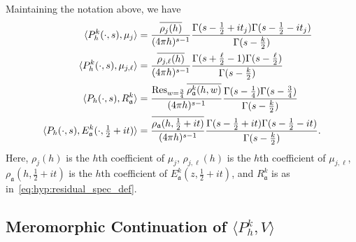 \begin{lemma}\label{lem:inner_product_list}
  Maintaining the notation above, we have
  \begin{align}
    \langle P_h^k(\cdot, s), \mu_j \rangle &= \frac{\overline{\rho_j(h)}}{(4\pi h)^{s-1}}
    \frac{\Gamma(s - \tfrac{1}{2} + it_j) \Gamma(s - \tfrac{1}{2} - it_j)}{\Gamma(s -
    \frac{k}{2})} \\
    \langle P_h^k(\cdot, s), \mu_{j,\ell} \rangle &=
    \frac{\overline{\rho_{j,\ell}(h)}}{(4\pi h)^{s-1}} \frac{\Gamma(s + \frac{\ell}{2} -
    1) \Gamma(s - \frac{\ell}{2})}{\Gamma(s - \frac{k}{2})} \\
    \langle P_h(\cdot, s), R^k_{\mathfrak{a}} \rangle &= \frac{\operatorname*{Res}_{w =
    \frac{3}{4}}\overline{\rho_{\mathfrak{a}}^k(h,w)}}{(4\pi h)^{s - 1}}  \frac{\Gamma(s -
    \frac{1}{4}) \Gamma(s - \frac{3}{4})}{\Gamma(s - \frac{k}{2})} \\
    \langle P_h(\cdot, s), E_{\mathfrak{a}}^k(\cdot, \tfrac{1}{2} + it)\rangle &=
    \frac{\overline{\rho_\mathfrak{a}(h, \tfrac{1}{2} + it)}}{(4\pi h)^{s-1}}
    \frac{\Gamma(s - \tfrac{1}{2} + it) \Gamma(s - \tfrac{1}{2} - it)}{\Gamma(s -
    \frac{k}{2})}.
  \end{align}
  Here, $\rho_j(h)$ is the $h$th coefficient of $\mu_j$, $\rho_{j, \ell}(h)$ is the $h$th
  coefficient of $\mu_{j,\ell}$, $\rho_{\mathfrak{a}}(h, \tfrac{1}{2} + it)$ is the
  $h$th coefficient of $E_{\mathfrak{a}}^k(z, \tfrac{1}{2} + it)$, and $R_\mathfrak{a}^k$
  is as in~\eqref{eq:hyp:residual_spec_def}.
\end{lemma}



\subsection{Meromorphic Continuation of $\langle P_h^k, V \rangle$}




